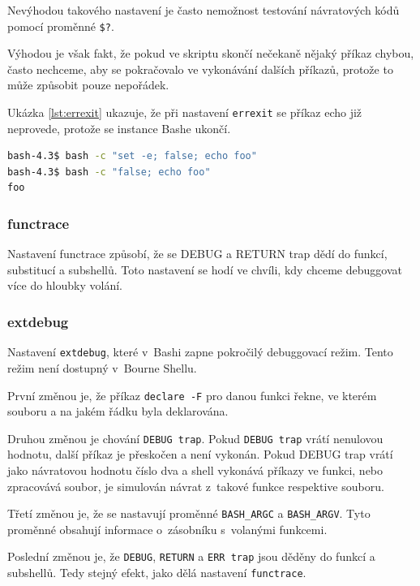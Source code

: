 \documentclass[thesis=M,czech]{FITthesis}[2012/06/26]
\begin{document}
Nevýhodou takového nastavení je často nemožnost testování návratových kódů pomocí proměnné \texttt{\$?}.

Výhodou je však fakt, že pokud ve skriptu skončí nečekaně nějaký příkaz chybou, často nechceme, aby se pokračovalo ve vykonávání dalších příkazů, protože to může způsobit pouze nepořádek.

Ukázka \ref{lst:errexit} ukazuje, že při nastavení \texttt{errexit} se příkaz echo již neprovede, protože se instance Bashe ukončí.

\noindent
\begin{minipage}{\linewidth}
\begin{lstlisting}[language=bash, caption={\texttt{errexit}}, label={lst:errexit}]
bash-4.3$ bash -c "set -e; false; echo foo"
bash-4.3$ bash -c "false; echo foo"
foo
\end{lstlisting}
\end{minipage}

%
%
%
\subsubsection{functrace}

Nastavení functrace způsobí, že se DEBUG a RETURN trap dědí do funkcí, substitucí a subshellů. Toto nastavení se hodí ve chvíli, kdy chceme debuggovat více do hloubky volání.

%
%
%
\subsubsection{extdebug}

Nastavení \texttt{extdebug}, které v~Bashi zapne pokročilý debuggovací režim. Tento režim není dostupný v~Bourne Shellu.

První změnou je, že příkaz \texttt{declare -F} pro danou funkci řekne, ve kterém souboru a na jakém řádku byla deklarována.

Druhou změnou je chování \texttt{DEBUG trap}. Pokud \texttt{DEBUG trap} vrátí nenulovou hodnotu, další příkaz je přeskočen a není vykonán. Pokud DEBUG trap vrátí jako návratovou hodnotu číslo dva a shell vykonává příkazy ve funkci, nebo zpracovává soubor, je simulován návrat z~takové funkce respektive souboru.

Třetí změnou je, že se nastavují proměnné \texttt{BASH\_ARGC} a \texttt{BASH\_ARGV}. Tyto proměnné obsahují informace o~zásobníku s~volanými funkcemi.

Poslední změnou je, že \texttt{DEBUG}, \texttt{RETURN} a \texttt{ERR trap} jsou děděny do funkcí a subshellů. Tedy stejný efekt, jako dělá nastavení \texttt{functrace}.
\end{document}
